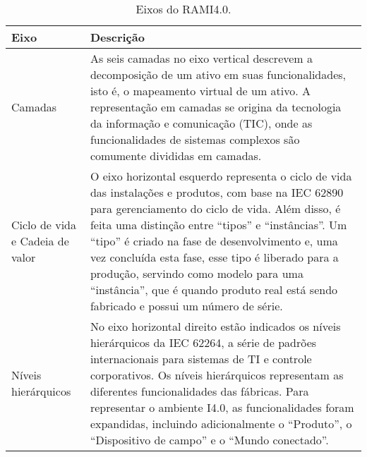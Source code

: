 \begin{table}[htb]
	\centering
	\footnotesize
	\caption{Eixos do RAMI4.0.}
	\begin{tabular}{p{3cm}p{12cm}}
		\hline
		\textbf{Eixo} & \textbf{Descrição}                                                                                                                                                                                                                                                                                                                                                                                                                                              \\

		\hline
		Camadas
		              & As seis camadas no eixo vertical descrevem a decomposição de um ativo em suas funcionalidades, isto é, o mapeamento virtual de um ativo. A representação em camadas se origina da tecnologia da informação e comunicação (TIC), onde as funcionalidades de sistemas complexos são comumente divididas em camadas.                                                                                                                                               \\

		\hline
		Ciclo de vida e  Cadeia de valor
		              & O eixo horizontal esquerdo representa o ciclo de vida das instalações e produtos, com base na IEC 62890 para gerenciamento do ciclo de vida. Além disso, é feita uma distinção entre ``tipos'' e ``instâncias''. Um ``tipo'' é criado na fase de desenvolvimento e, uma vez concluída esta fase, esse tipo é liberado para a produção, servindo como modelo para uma ``instância'', que é quando produto real está sendo fabricado e possui um número de série. \\

		\hline
		Níveis hierárquicos
		              & No eixo horizontal direito estão indicados os níveis hierárquicos da IEC 62264, a série de padrões internacionais para sistemas de TI e controle corporativos. Os níveis hierárquicos representam as diferentes funcionalidades das fábricas. Para representar o ambiente I4.0, as funcionalidades foram expandidas, incluindo adicionalmente o ``Produto'', o ``Dispositivo de campo'' e o ``Mundo conectado''.                                                \\
		\hline
	\end{tabular}
	\label{tab:rami-eixos}
\end{table}

